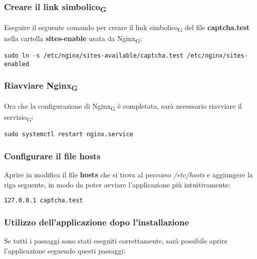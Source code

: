 \subsubsection{Creare il link simbolico\textsubscript{G}}
Eseguire il seguente comando per creare il link simbolico\textsubscript{G} del file \textbf{captcha.test} nella cartella \textbf{sites-enable} usata da Nginx\textsubscript{G}:
\begin{verbatim}
sudo ln -s /etc/nginx/sites-available/captcha.test /etc/nginx/sites-enabled
\end{verbatim}

\subsubsection{Riavviare Nginx\textsubscript{G}}
Ora che la configurazione di Nginx\textsubscript{G} è completata, sarà necessario riavviare il servizio\textsubscript{G}:
\begin{verbatim}
sudo systemctl restart nginx.service
\end{verbatim}

\subsubsection{Configurare il file hosts}
Aprire in modifica il file \textbf{hosts} che si trova al percorso \textit{/etc/hosts} e aggiungere la riga seguente, in modo da poter avviare l'applicazione più intuitivamente:
\begin{verbatim}
127.0.0.1 captcha.test
\end{verbatim}

\subsubsection{Utilizzo dell'applicazione dopo l'installazione}
Se tutti i passaggi sono stati eseguiti correttamente, sarà possibile aprire l'applicazione seguendo questi passaggi:
